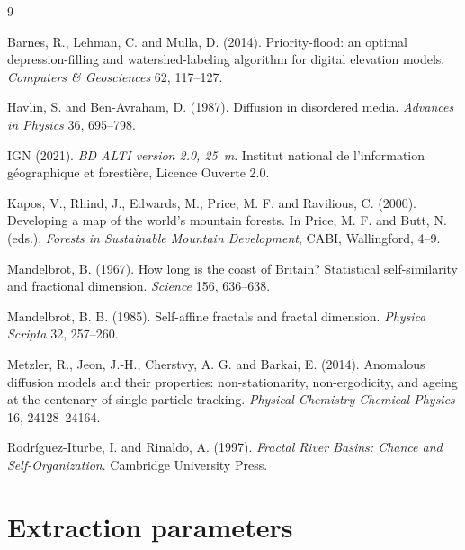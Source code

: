 \documentclass[11pt,a4paper]{article}
\begin{document}
\begin{thebibliography}{9}

Barnes, R., Lehman, C. and Mulla, D. (2014).
Priority-flood: an optimal depression-filling and watershed-labeling
algorithm for digital elevation models.
\emph{Computers \& Geosciences} 62, 117--127.

Havlin, S. and Ben-Avraham, D. (1987).
Diffusion in disordered media.
\emph{Advances in Physics} 36, 695--798.

IGN (2021).
\emph{BD ALTI version 2.0, 25~m}. Institut national de l'information
g\'eographique et foresti\`ere, Licence Ouverte 2.0.

Kapos, V., Rhind, J., Edwards, M., Price, M. F. and Ravilious, C. (2000).
Developing a map of the world's mountain forests.
In Price, M. F. and Butt, N. (eds.), \emph{Forests in Sustainable Mountain
Development}, CABI, Wallingford, 4--9.

Mandelbrot, B. (1967).
How long is the coast of Britain? Statistical self-similarity and fractional
dimension.
\emph{Science} 156, 636--638.

Mandelbrot, B. B. (1985).
Self-affine fractals and fractal dimension.
\emph{Physica Scripta} 32, 257--260.

Metzler, R., Jeon, J.-H., Cherstvy, A. G. and Barkai, E. (2014).
Anomalous diffusion models and their properties: non-stationarity,
non-ergodicity, and ageing at the centenary of single particle tracking.
\emph{Physical Chemistry Chemical Physics} 16, 24128--24164.

Rodr\'iguez-Iturbe, I. and Rinaldo, A. (1997).
\emph{Fractal River Basins: Chance and Self-Organization}.
Cambridge University Press.

\end{thebibliography}

\appendix

\section{Extraction parameters}
\label{app:params}
\end{document}
